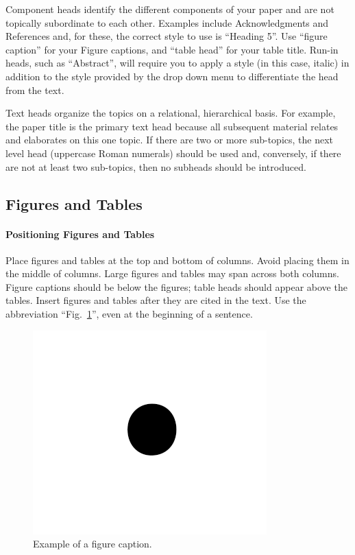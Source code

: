 \documentclass[conference]{IEEEtran}
\begin{document}
Component heads identify the different components of your paper and are not 
topically subordinate to each other. Examples include Acknowledgments and 
References and, for these, the correct style to use is ``Heading 5''. Use 
``figure caption'' for your Figure captions, and ``table head'' for your 
table title. Run-in heads, such as ``Abstract'', will require you to apply a 
style (in this case, italic) in addition to the style provided by the drop 
down menu to differentiate the head from the text.

Text heads organize the topics on a relational, hierarchical basis. For 
example, the paper title is the primary text head because all subsequent 
material relates and elaborates on this one topic. If there are two or more 
sub-topics, the next level head (uppercase Roman numerals) should be used 
and, conversely, if there are not at least two sub-topics, then no subheads 
should be introduced.

\subsection{Figures and Tables}
\paragraph{Positioning Figures and Tables} Place figures and tables at the top and 
bottom of columns. Avoid placing them in the middle of columns. Large 
figures and tables may span across both columns. Figure captions should be 
below the figures; table heads should appear above the tables. Insert 
figures and tables after they are cited in the text. Use the abbreviation 
``Fig.~\ref{fig}'', even at the beginning of a sentence.

\begin{figure}[htbp]
\centerline{\includegraphics{fig1.png}}
\caption{Example of a figure caption.}
\label{fig}
\end{figure}
\end{document}
